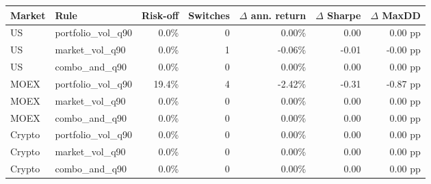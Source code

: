 \scriptsize
\setlength{\tabcolsep}{5pt}
\begin{tabular}{llrrrrr}
\toprule
Market & Rule & Risk-off & Switches & $\Delta$ ann. return & $\Delta$ Sharpe & $\Delta$ MaxDD \\
\midrule
US & portfolio\_vol\_q90 & 0.0\% & 0 & 0.00\% & 0.00 & 0.00 pp \\
US & market\_vol\_q90 & 0.0\% & 1 & -0.06\% & -0.01 & -0.00 pp \\
US & combo\_and\_q90 & 0.0\% & 0 & 0.00\% & 0.00 & 0.00 pp \\
MOEX & portfolio\_vol\_q90 & 19.4\% & 4 & -2.42\% & -0.31 & -0.87 pp \\
MOEX & market\_vol\_q90 & 0.0\% & 0 & 0.00\% & 0.00 & 0.00 pp \\
MOEX & combo\_and\_q90 & 0.0\% & 0 & 0.00\% & 0.00 & 0.00 pp \\
Crypto & portfolio\_vol\_q90 & 0.0\% & 0 & 0.00\% & 0.00 & 0.00 pp \\
Crypto & market\_vol\_q90 & 0.0\% & 0 & 0.00\% & 0.00 & 0.00 pp \\
Crypto & combo\_and\_q90 & 0.0\% & 0 & 0.00\% & 0.00 & 0.00 pp \\
\bottomrule
\end{tabular}

